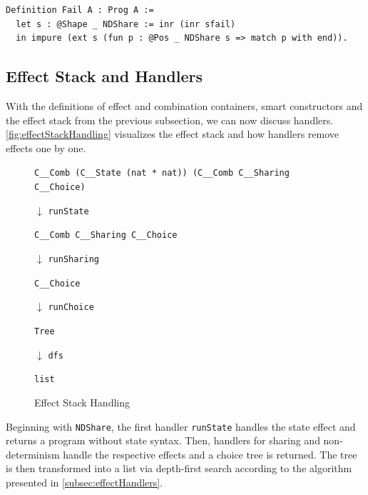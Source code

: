 \documentclass[a4paper, 11pt, fleqn, twoside, abstract=on]{scrreprt}
\newcommand{\cinl}[1]{\texttt{#1}}
\begin{document}
\begin{verbatim}
Definition Fail A : Prog A :=
  let s : @Shape _ NDShare := inr (inr sfail)
  in impure (ext s (fun p : @Pos _ NDShare s => match p with end)).
\end{verbatim}

\subsection{Effect Stack and Handlers}
\label{subsec:effectstack}

With the definitions of effect and combination containers, smart constructors and the effect stack from the previous subsection, we can now discuss handlers.
\autoref{fig:effectStackHandling} visualizes the effect stack and how handlers remove effects one by one.

\begin{figure}[H]
{\centering \cinl{C__Comb (C__State (nat * nat)) (C__Comb C__Sharing C__Choice)} \par}

\hspace*{.48\textwidth} {\Large \boldmath $\downarrow$} \texttt{runState}

{\centering \cinl{C__Comb C__Sharing C__Choice} \par}

\hspace*{.48\textwidth} {\Large \boldmath $\downarrow$} \texttt{runSharing}

{\centering \cinl{C__Choice} \par}

\hspace*{.48\textwidth} {\Large \boldmath $\downarrow$} \texttt{runChoice}

{\centering \cinl{Tree} \par}

\hspace*{.48\textwidth} {\Large \boldmath $\downarrow$} \texttt{dfs}

{\centering \cinl{list} \par}
\caption{Effect Stack Handling}
\label{fig:effectStackHandling}
\end{figure}

Beginning with \cinl{NDShare}, the first handler \cinl{runState} handles the state effect and returns a program without state syntax.
Then, handlers for sharing and non-determinism handle the respective effects and a choice tree is returned.
The tree is then transformed into a list via depth-first search according to the algorithm presented in \autoref{subsec:effectHandlers}.
\end{document}

